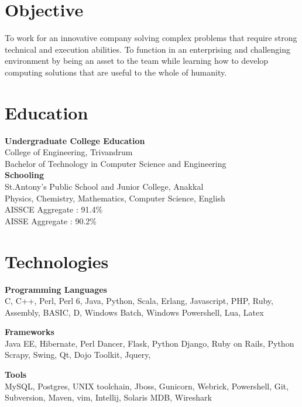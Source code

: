 \documentclass[line,margin]{res}
\begin{document}


\address{joji\_antony@gmx.com}
\address{+91 96323 41954}

\begin{resume}
\section{Objective}
To work for an innovative company solving complex problems that require strong technical and execution abilities. To function in an enterprising and challenging environment by being an asset to the team while learning how to develop computing solutions that are useful to the whole of humanity.\\

\section{Education}

{\bf Undergraduate College Education}\\
College of Engineering, Trivandrum\\
Bachelor of Technology in Computer Science and Engineering\\

{\bf Schooling} \\
St.Antony's Public School and Junior College, Anakkal\\
Physics, Chemistry, Mathematics, Computer Science, English\\

AISSCE Aggregate : 91.4\%\\
AISSE Aggregate : 90.2\%\\

\section{Technologies}

{\bf Programming Languages}\\
C, C++, Perl, Perl 6, Java, Python, Scala, Erlang, Javascript, PHP, Ruby, Assembly, BASIC, D, Windows Batch, Windows Powershell, Lua, Latex

{\bf Frameworks}\\
Java EE, Hibernate, Perl Dancer, Flask, Python Django, Ruby on Rails, Python Scrapy, Swing, Qt, Dojo Toolkit, Jquery, 

{\bf Tools}\\
MySQL, Postgres, UNIX toolchain, Jboss, Gunicorn, Webrick, Powershell, Git, Subversion, Maven, vim, Intellij, Solaris MDB, Wireshark


\end{resume}
\end{document}
